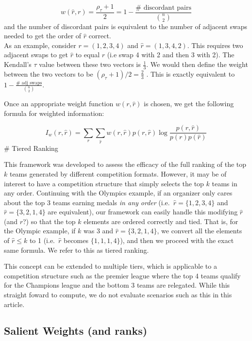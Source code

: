 \documentclass[
  12pt]{article}
\begin{document}
\[
w(\hat{r},r) = \frac{\rho_\tau + 1}{2} = 1 - \frac{\# \text{ discordant pairs}}{{n \choose 2}}
\] and the number of discordant pairs is equivalent to the number of
adjacent swaps needed to get the order of \(\hat{r}\) correct.\\
As an example, consider \(r = (1,2,3,4)\) and \(\hat{r} = (1,3,4,2)\).
This requires two adjacent swaps to get \(\hat{r}\) to equal \(r\) (i.e
swap 4 with 2 and then 3 with 2). The Kendall's \(\tau\) value between
these two vectors is \(\frac{1}{3}\). We would then define the weight
between the two vectors to be \((\rho_{\tau} + 1)/2 = \frac{2}{3}\) .
This is exactly equivalent to
\(1 - \frac{\#\text{ adj swaps}}{{n \choose 2}}\).

Once an appropriate weight function \(w(r, \hat{r})\) is chosen, we get
the following formula for weighted information:

\[
I_w(r,\hat{r})= \sum_{r}\sum_{\hat{r}}w(r, \hat{r})p(r,\hat{r})\log \frac {p(r,\hat{r})}{p(r)p(\hat{r})}
\] \# Tiered Ranking

This framework was developed to assess the efficacy of the full ranking
of the top \(k\) teams generated by different competition formats.
However, it may be of interest to have a competition structure that
simply selects the top \(k\) teams in any order. Continuing with the
Olympics example, if an organizer only cares about the top 3 teams
earning medals \emph{in any order} (i.e.~\(\hat{r} = \{1,2,3,4\}\) and
\(\hat{r} = \{3,2,1,4\}\) are equivalent), our framework can easily
handle this modifying \(\hat{r}\) (and \(r\)?) so that the top \(k\)
elements are ordered correctly and tied. That is, for the Olympic
example, if \(k\) was 3 and \(\hat{r} = \{3,2,1,4\}\), we convert all
the elements of \(\hat{r} \le k\) to 1 (i.e.~\(\hat{r}\) becomes
\(\{1,1,1,4\}\)), and then we proceed with the exact same formula. We
refer to this as tiered ranking.

This concept can be extended to multiple tiers, which is applicable to a
competition structure such as the premier league where the top 4 teams
qualify for the Champions league and the bottom 3 teams are relegated.
While this straight foward to compute, we do not evaluate scenarios such
as this in this article.

\subsection{Salient Weights (and
ranks)}\label{salient-weights-and-ranks}
\end{document}
